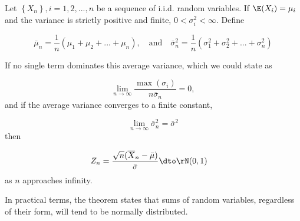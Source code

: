 \documentclass[english,12pt]{book}\usepackage[]{graphicx}\usepackage[]{xcolor}
\begin{document}
\begin{theorem}\label{theorem:LF_CLT_U}
Let $\left\lbrace X_n\right\rbrace, i = 1, 2,...,n$ be a sequence of i.i.d. random variables. If $\E(X_i) = \mu_i$ and the variance is strictly positive and finite, $0 < \sigma^2_i < \infty$. Define 

\begin{equation*}
  \bar{\mu}_n = \frac{1}{n}(\mu_1 + \mu_2 + ... +\mu_n), \quad \mbox{and} \quad \bar{\sigma}^2_n =\frac{1}{n}(\sigma^2_1 + \sigma^2_2 + ... +\sigma^2_n)
\end{equation*}

If no single term dominates this average variance, which we could state as

\begin{equation*}
\lim_{n\to \infty} \frac{\max (\sigma_i)}{n \bar{\sigma}_n} = 0,
\end{equation*}
%
and if the average variance converges to a finite constant,

\begin{equation*}
\lim_{n\to \infty} \bar{\sigma}^2_n = \bar{\sigma}^2
\end{equation*}
%
then

\begin{equation*}
  \begin{aligned}
      Z_n &  = \frac{\sqrt{n}(\overline{X}_n - \bar{\mu})}{\bar{\sigma}} \dto \rN(0, 1)
  \end{aligned}
\end{equation*}
%
 as $n$ approaches infinity.
\end{theorem}

In practical terms, the theorem states that sums of random variables, regardless of their form, will tend to be normally distributed. 
\end{document}
